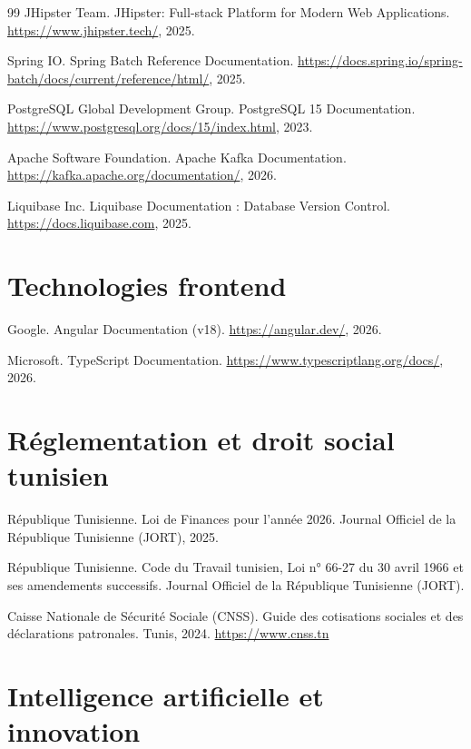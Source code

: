 \documentclass[12pt,a4paper]{report}
\begin{document}
\begin{thebibliography}{99}
JHipster Team.
JHipster: Full-stack Platform for Modern Web Applications.
\url{https://www.jhipster.tech/}, 2025.

Spring IO.
Spring Batch Reference Documentation.
\url{https://docs.spring.io/spring-batch/docs/current/reference/html/}, 2025.

PostgreSQL Global Development Group.
PostgreSQL 15 Documentation.
\url{https://www.postgresql.org/docs/15/index.html}, 2023.

Apache Software Foundation.
Apache Kafka Documentation.
\url{https://kafka.apache.org/documentation/}, 2026.

Liquibase Inc.
Liquibase Documentation : Database Version Control.
\url{https://docs.liquibase.com}, 2025.

\section*{Technologies frontend}

Google.
Angular Documentation (v18).
\url{https://angular.dev/}, 2026.

Microsoft.
TypeScript Documentation.
\url{https://www.typescriptlang.org/docs/}, 2026.

\section*{Réglementation et droit social tunisien}

République Tunisienne.
Loi de Finances pour l'année 2026.
Journal Officiel de la République Tunisienne (JORT), 2025.

République Tunisienne.
Code du Travail tunisien,
Loi n° 66-27 du 30 avril 1966 et ses amendements successifs.
Journal Officiel de la République Tunisienne (JORT).

Caisse Nationale de Sécurité Sociale (CNSS).
Guide des cotisations sociales et des déclarations patronales.
Tunis, 2024. \url{https://www.cnss.tn}

\section*{Intelligence artificielle et innovation}


\end{thebibliography}
\end{document}
